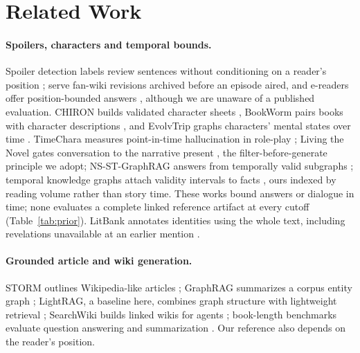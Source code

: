 \section{Related Work}
\label{sec:related}

\paragraph{Spoilers, characters and temporal bounds.}
Spoiler detection labels review sentences without conditioning on a reader's position
\citep{wan2019spoiler}; \citet{jones2018spoilers} serve fan-wiki revisions archived before an
episode aired, and e-readers offer position-bounded answers \citep{amazon2025kindle}, although we are
unaware of a published evaluation. CHIRON builds validated character sheets \citep{gurung2024chiron},
BookWorm pairs books with character descriptions \citep{papoudakis2024bookworm}, and
EvolvTrip graphs characters' mental states over time \citep{yang2025evolvtrip}. TimeChara
measures point-in-time hallucination in role-play \citep{ahn2024timechara}; Living the Novel
gates conversation to the narrative present \citep{huang2025living}, the
filter-before-generate principle we adopt; NS-ST-GraphRAG answers from temporally valid
subgraphs \citep{lin2026nsst}; temporal knowledge graphs attach validity intervals to facts
\citep{dasgupta2018hyte}, ours indexed by reading volume rather than story time. These works
bound answers or dialogue in time; none evaluates a complete linked reference artifact at
every cutoff (Table~\ref{tab:prior}). LitBank annotates identities using the whole text,
including revelations unavailable at an earlier mention \citep{bamman2020litbank}.

\paragraph{Grounded article and wiki generation.}
STORM outlines Wikipedia-like articles \citep{shao2024storm}; GraphRAG summarizes a corpus
entity graph \citep{edge2024graphrag}; LightRAG, a baseline here, combines graph structure with
lightweight retrieval \citep{guo2024lightrag}; SearchWiki builds linked wikis for agents
\citep{singh2026searchwiki}; book-length benchmarks evaluate question answering and
summarization \citep{wang2024novelqa,chang2024booookscore}. Our reference also depends on the
reader's position.

